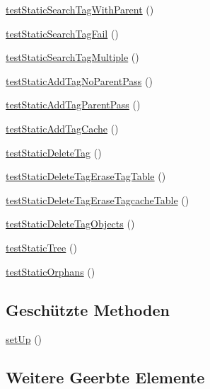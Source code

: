 \begin{DoxyCompactItemize}
\hyperlink{classTests_1_1Unit_1_1TagTest_afa0328da6fb0cd379203f7654df0c6aa}{test\+Static\+Search\+Tag\+With\+Parent} ()
\item 
\hyperlink{classTests_1_1Unit_1_1TagTest_a3d80663d67b557fbddc6b63d845654e0}{test\+Static\+Search\+Tag\+Fail} ()
\item 
\hyperlink{classTests_1_1Unit_1_1TagTest_a5cd3ae1878b407b0234ca6a30eac4e3a}{test\+Static\+Search\+Tag\+Multiple} ()
\item 
\hyperlink{classTests_1_1Unit_1_1TagTest_a30ef99511648a0a93e792d805ed7082e}{test\+Static\+Add\+Tag\+No\+Parent\+Pass} ()
\item 
\hyperlink{classTests_1_1Unit_1_1TagTest_a242ea2f3663fba54d4c6e55551fd683d}{test\+Static\+Add\+Tag\+Parent\+Pass} ()
\item 
\hyperlink{classTests_1_1Unit_1_1TagTest_a2282a112de522cfc583054bc38c061e5}{test\+Static\+Add\+Tag\+Cache} ()
\item 
\hyperlink{classTests_1_1Unit_1_1TagTest_a195ee2c488b8d12d46c2042ce725cbec}{test\+Static\+Delete\+Tag} ()
\item 
\hyperlink{classTests_1_1Unit_1_1TagTest_aa1d53f93542067c667dcbf8a9d1b7eb3}{test\+Static\+Delete\+Tag\+Erase\+Tag\+Table} ()
\item 
\hyperlink{classTests_1_1Unit_1_1TagTest_a5cb720660d1509bd2a6d12bab6d9f2ec}{test\+Static\+Delete\+Tag\+Erase\+Tagcache\+Table} ()
\item 
\hyperlink{classTests_1_1Unit_1_1TagTest_a0398e7356a729f023f5f000918d7486c}{test\+Static\+Delete\+Tag\+Objects} ()
\item 
\hyperlink{classTests_1_1Unit_1_1TagTest_ae00b6cae6388bdabf451ec6af082687b}{test\+Static\+Tree} ()
\item 
\hyperlink{classTests_1_1Unit_1_1TagTest_a4f86820c24086f101687de916ea45dcc}{test\+Static\+Orphans} ()
\end{DoxyCompactItemize}
\subsection*{Geschützte Methoden}
\begin{DoxyCompactItemize}
\item 
\hyperlink{classTests_1_1Unit_1_1TagTest_a81aed231294c46a819ff5c809f4c9b1f}{set\+Up} ()
\end{DoxyCompactItemize}
\subsection*{Weitere Geerbte Elemente}


